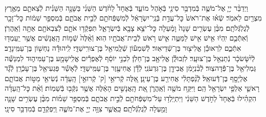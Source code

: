 \documentclass[twoside, openany, parskip=half, 11pt]{book}
\begin{document}
\begin{footnotesize}
\begin{multicols}{2}
\\
וַיְדַבֵּ֨ר יְיָ֧ אֶל־מֹשֶׁ֛ה בְּֿמִדְבַּ֥ר סִינַ֖י בְּֿאֹ֣הֶל מוֹעֵ֑ד בְּֿאֶחָד֩ לַחֹ֨דֶשׁ הַשֵּׁנִ֜י בַּשָּׁנָ֣ה הַשֵּׁנִ֗ית לְֿצֵאתָ֛ם מֵאֶ֥רֶץ מִצְרַ֖יִם לֵאמֹֽר׃ שְֿׂא֗וּ אֶת־רֹאשׁ֙ כׇּל־עֲדַ֣ת בְּֿנֵֽי־יִשְׂרָאֵ֔ל לְֿמִשְׁפְּֿחֹתָ֖ם לְֿבֵ֣ית אֲבֹתָ֑ם בְּֿמִסְפַּ֣ר שֵׁמ֔וֹת כׇּל־זָכָ֖ר לְֿגֻלְגְּֿלֹתָֽם׃ מִבֶּ֨ן עֶשְׂרִ֤ים שָׁנָה֙ וָמַ֔עְלָה כׇּל־יֹצֵ֥א צָבָ֖א בְּֿיִשְׂרָאֵ֑ל תִּפְקְֿד֥וּ אֹתָ֛ם לְֿצִבְאֹתָ֖ם אַתָּ֥ה וְֿאַֽהֲרֹֽן׃ וְֿאִתְּֿכֶ֣ם יִֽהְי֔וּ אִ֥ישׁ אִ֖ישׁ לַמַּטֶּ֑ה אִ֛ישׁ רֹ֥אשׁ לְֿבֵית־אֲבֹתָ֖יו הֽוּא׃  וְֿאֵ֨לֶּה֙ שְֿׁמ֣וֹת הָֽאֲנָשִׁ֔ים אֲשֶׁ֥ר יַֽעַמְד֖וּ אִתְּֿכֶ֑ם לִרְאוּבֵ֕ן אֱלִיצ֖וּר בֶּן־שְֿׁדֵיאֽוּר׃ לְֿשִׁמְע֕וֹן שְֿׁלֻֽמִיאֵ֖ל בֶּן־צוּרִֽישַׁדָּֽי׃ לִֽיהוּדָ֕ה נַחְשׁ֖וֹן בֶּן־עַמִּֽינָדָֽב׃ לְֿיִ֨שָּׂשׂכָ֔ר נְֿתַנְאֵ֖ל בֶּן־צוּעָֽר׃ לִזְבוּלֻ֕ן אֱלִיאָ֖ב בֶּן־חֵלֹֽן׃ לִבְנֵ֣י יוֹסֵ֔ף לְֿאֶפְרַ֕יִם אֱלִֽישָׁמָ֖ע בֶּן־עַמִּיה֑וּד לִמְנַשֶּׁ֕ה גַּמְלִיאֵ֖ל בֶּן־פְּֿֿדָהצֽוּר׃ לְֿבִ֨נְיָמִ֔ן אֲבִידָ֖ן בֶּן־גִּדְעֹנִֽי׃ לְֿדָ֕ן אֲחִיעֶ֖זֶר בֶּן־עַמִּֽישַׁדָּֽי׃ לְֿאָשֵׁ֕ר פַּגְעִיאֵ֖ל בֶּן־עָכְֿרָֽן׃ לְֿגָ֕ד אֶלְיָסָ֖ף בֶּן־דְּֿֿעוּאֵֽל׃ לְֿנַ֨פְתָּלִ֔י אֲחִירַ֖ע בֶּן־עֵינָֽן׃ אֵ֚לֶּה קְֿריּאֵ֣י [ק' קְֿרוּאֵ֣י] הָֽעֵדָ֔ה נְֿשִׂיאֵ֖י מַטּ֣וֹת אֲבוֹתָ֑ם רָאשֵׁ֛י אַלְפֵ֥י יִשְׂרָאֵ֖ל הֵֽם׃  וַיִּקַּ֥ח מֹשֶׁ֖ה וְֿאַֽהֲרֹ֑ן אֵ֚ת הָֽאֲנָשִׁ֣ים הָאֵ֔לֶּה אֲשֶׁ֥ר נִקְּֿב֖וּ בְּֿשֵׁמֽוֹת׃ וְֿאֵ֨ת כׇּל־הָֽעֵדָ֜ה הִקְהִ֗ילוּ בְּֿאֶחָד֙ לַחֹ֣דֶשׁ הַשֵּׁנִ֔י וַיִּתְיַֽלְד֥וּ עַל־מִשְׁפְּֿחֹתָ֖ם לְֿבֵ֣ית אֲבֹתָ֑ם בְּֿמִסְפַּ֣ר שֵׁמ֗וֹת מִבֶּ֨ן עֶשְׂרִ֥ים שָׁנָ֛ה וָמַ֖עְלָה לְֿגֻלְגְּֿלֹתָֽם׃ כַּֽאֲשֶׁ֛ר צִוָּ֥ה יְיָ֖ אֶת־מֹשֶׁ֑ה וַֽיִּפְקְֿדֵ֖ם בְּֿמִדְבַּ֥ר סִינָֽי׃


\end{multicols}
\end{footnotesize}
\end{document}
